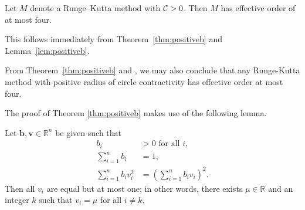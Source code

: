 \begin{corollary}\label{cor:no-ssp-5}
    Let $M$ denote a Runge--Kutta method with $\mathcal{C}>0$.
    Then $M$ has effective order of at most four.
\end{corollary}
This follows immediately from Theorem~\ref{thm:positiveb} and Lemma~\ref{lem:positiveb}.

\begin{remark}
  From Theorem~\ref{thm:positiveb} and \cite[Theorem~4.1]{dahlquist2006}, we
  may also conclude that any Runge-Kutta method with positive radius of circle contractivity
  has effective order at most four.
\end{remark}

The proof of Theorem \ref{thm:positiveb} makes use of the following lemma.
\begin{lemma}\label{Davids_lemma}
	Let $\bm{b},\bm{v} \in \mathbb{R}^{n}$ be given such that
    \begin{subequations}\label{eq:DavidsLemma}
    		\begin{align}
    			b_i & > 0 \mbox{ for all } i, \label{eq:DavidsLemma_a} \\
    			\sum_{i=1}^n b_i & = 1, \label{eq:DavidsLemma_b} \\
    			\sum_{i=1}^n b_i v_i^2 & = \left(\sum_{i=1}^n b_i v_i \right)^2. \label{eq:DavidsLemma_c}
    		\end{align}
    	\end{subequations}
    	Then all $v_i$ are equal but at most one; in other words, there exists $\mu \in \mathbb{R}$ and an integer $k$ such that $v_i = \mu$ for all $i \ne k$.
\end{lemma}

